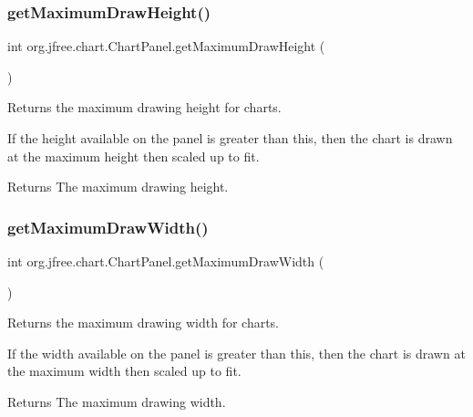 \subsubsection{\texorpdfstring{get\+Maximum\+Draw\+Height()}{getMaximumDrawHeight()}}
{\footnotesize\ttfamily int org.\+jfree.\+chart.\+Chart\+Panel.\+get\+Maximum\+Draw\+Height (\begin{DoxyParamCaption}{ }\end{DoxyParamCaption})}

Returns the maximum drawing height for charts. 

If the height available on the panel is greater than this, then the chart is drawn at the maximum height then scaled up to fit.

\begin{DoxyReturn}{Returns}
The maximum drawing height. 
\end{DoxyReturn}
\mbox{\label{classorg_1_1jfree_1_1chart_1_1_chart_panel_a9b32dd4ce124173e59d256f9e1d77ef8}} 
\subsubsection{\texorpdfstring{get\+Maximum\+Draw\+Width()}{getMaximumDrawWidth()}}
{\footnotesize\ttfamily int org.\+jfree.\+chart.\+Chart\+Panel.\+get\+Maximum\+Draw\+Width (\begin{DoxyParamCaption}{ }\end{DoxyParamCaption})}

Returns the maximum drawing width for charts. 

If the width available on the panel is greater than this, then the chart is drawn at the maximum width then scaled up to fit.

\begin{DoxyReturn}{Returns}
The maximum drawing width. 
\end{DoxyReturn}
\mbox{\label{classorg_1_1jfree_1_1chart_1_1_chart_panel_a8976864e565b7faaa132d044d5559b47}} 
